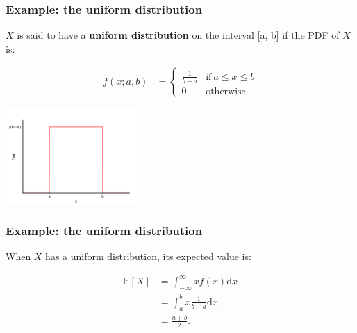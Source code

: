 \documentclass[10pt]{beamer}
\begin{document}
\begin{frame}
\frametitle{Example: the uniform distribution}

\begin{definition}
$X$ is said to have a \textbf{uniform distribution} on the interval [a, b] if the PDF of $X$ is:

\vspace{-.5cm}

\begin{align*}
    f(x; a, b) &= 
    \begin{cases}
      \frac{1}{b-a} & \text{if}\ a \leq x \leq b \\
      0 & \text{otherwise.}
    \end{cases}
\end{align*}
\end{definition}

\center \includegraphics[height=3.6cm]{images/uniform_pdf.png}

\end{frame}

\begin{frame}
\frametitle{Example: the uniform distribution}

When $X$ has a uniform distribution, its expected value is:

\vspace{-.3cm}

\begin{align*}
    \mathbb{E}[X] &= \int_{-\infty}^\infty x f(x) \mathrm{d}x \\
    &= \int_{a}^b x \frac{1}{b-a} \mathrm{d}x \\
    &= \frac{a + b}{2}.
\end{align*}


\end{frame}
\end{document}
